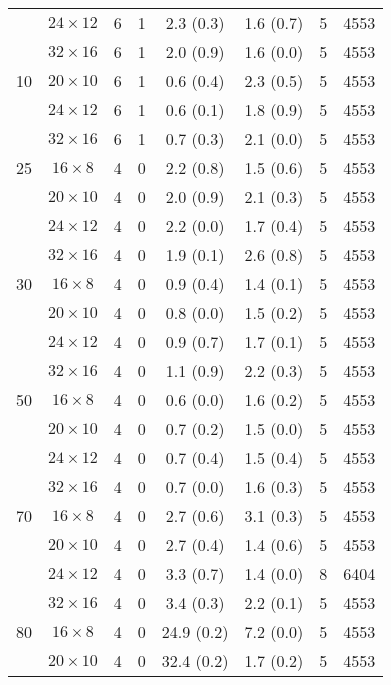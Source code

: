 \begin{longtable}{cccccccc}
    & $24 \times  12$ &  6 & 1 & 2.3 \; (0.3) & 1.6 \; (0.7) & 5 & 4553 \\
    & $32 \times  16$ &  6 & 1 & 2.0 \; (0.9) & 1.6 \; (0.0) & 5 & 4553 \\
\midrule
 10 & $20 \times  10$ &  6 & 1 & 0.6 \; (0.4) & 2.3 \; (0.5) & 5 & 4553 \\
    & $24 \times  12$ &  6 & 1 & 0.6 \; (0.1) & 1.8 \; (0.9) & 5 & 4553 \\
    & $32 \times  16$ &  6 & 1 & 0.7 \; (0.3) & 2.1 \; (0.0) & 5 & 4553 \\
\midrule
 25 & $16 \times   8$ &  4 & 0 & 2.2 \; (0.8) & 1.5 \; (0.6) & 5 & 4553 \\
    & $20 \times  10$ &  4 & 0 & 2.0 \; (0.9) & 2.1 \; (0.3) & 5 & 4553 \\
    & $24 \times  12$ &  4 & 0 & 2.2 \; (0.0) & 1.7 \; (0.4) & 5 & 4553 \\
    & $32 \times  16$ &  4 & 0 & 1.9 \; (0.1) & 2.6 \; (0.8) & 5 & 4553 \\
\midrule
 30 & $16 \times   8$ &  4 & 0 & 0.9 \; (0.4) & 1.4 \; (0.1) & 5 & 4553 \\
    & $20 \times  10$ &  4 & 0 & 0.8 \; (0.0) & 1.5 \; (0.2) & 5 & 4553 \\
    & $24 \times  12$ &  4 & 0 & 0.9 \; (0.7) & 1.7 \; (0.1) & 5 & 4553 \\
    & $32 \times  16$ &  4 & 0 & 1.1 \; (0.9) & 2.2 \; (0.3) & 5 & 4553 \\
\midrule
 50 & $16 \times   8$ &  4 & 0 & 0.6 \; (0.0) & 1.6 \; (0.2) & 5 & 4553 \\
    & $20 \times  10$ &  4 & 0 & 0.7 \; (0.2) & 1.5 \; (0.0) & 5 & 4553 \\
    & $24 \times  12$ &  4 & 0 & 0.7 \; (0.4) & 1.5 \; (0.4) & 5 & 4553 \\
    & $32 \times  16$ &  4 & 0 & 0.7 \; (0.0) & 1.6 \; (0.3) & 5 & 4553 \\
\midrule
 70 & $16 \times   8$ &  4 & 0 & 2.7 \; (0.6) & 3.1 \; (0.3) & 5 & 4553 \\
    & $20 \times  10$ &  4 & 0 & 2.7 \; (0.4) & 1.4 \; (0.6) & 5 & 4553 \\
    & $24 \times  12$ &  4 & 0 & 3.3 \; (0.7) & 1.4 \; (0.0) & 8 & 6404 \\
    & $32 \times  16$ &  4 & 0 & 3.4 \; (0.3) & 2.2 \; (0.1) & 5 & 4553 \\
\midrule
 80 & $16 \times   8$ &  4 & 0 & 24.9 \; (0.2) & 7.2 \; (0.0) & 5 & 4553 \\
    & $20 \times  10$ &  4 & 0 & 32.4 \; (0.2) & 1.7 \; (0.2) & 5 & 4553 \\

\end{longtable}
